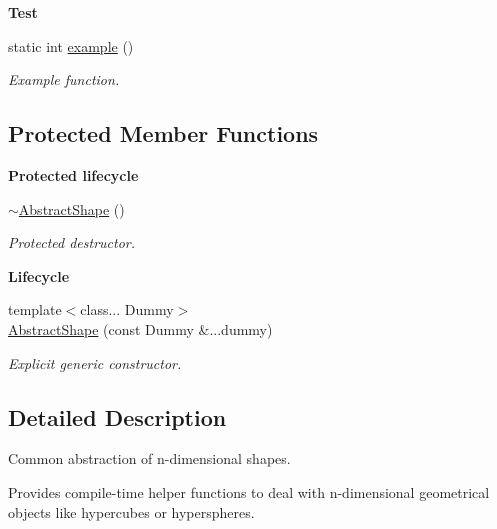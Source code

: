 \begin{Indent}{\bf Test}\par
\begin{DoxyCompactItemize}
\item 
static int \hyperlink{classmagrathea_1_1AbstractShape_a4a507954044448b960294dbc12cb668f}{example} ()
\begin{DoxyCompactList}\small\item\em Example function. \end{DoxyCompactList}\end{DoxyCompactItemize}
\end{Indent}
\subsection*{Protected Member Functions}
\begin{Indent}{\bf Protected lifecycle}\par
\begin{DoxyCompactItemize}
\item 
\hyperlink{classmagrathea_1_1AbstractShape_aa4a59365d6616259ab2fe03c4c37c740}{$\sim$\-Abstract\-Shape} ()
\begin{DoxyCompactList}\small\item\em Protected destructor. \end{DoxyCompactList}\end{DoxyCompactItemize}
\end{Indent}
\begin{Indent}{\bf Lifecycle}\par
\begin{DoxyCompactItemize}
\item 
{\footnotesize template$<$class... Dummy$>$ }\\\hyperlink{classmagrathea_1_1AbstractShape_a9a6c6b4f5dd7bbea6625eb64fb162687}{Abstract\-Shape} (const Dummy \&...dummy)
\begin{DoxyCompactList}\small\item\em Explicit generic constructor. \end{DoxyCompactList}\end{DoxyCompactItemize}
\end{Indent}


\subsection{Detailed Description}
Common abstraction of n-\/dimensional shapes. 

Provides compile-\/time helper functions to deal with n-\/dimensional geometrical objects like hypercubes or hyperspheres. 

